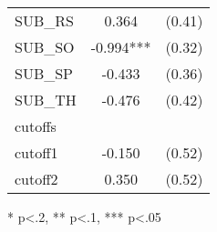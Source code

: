 \begin{table}[htb]
\begin{threeparttable}
\begin{tabular}{l c c}
      SUB\_RS                               & 0.364                  & (0.41)               \\
      SUB\_SO                               & -0.994***              & (0.32)               \\
      SUB\_SP                               & -0.433                 & (0.36)               \\
      SUB\_TH                               & -0.476                 & (0.42)               \\
      \hline
      cutoffs                               &                        &                      \\
      cutoff1                               & -0.150                 & (0.52)               \\
      cutoff2                               & 0.350                  & (0.52)               \\
      \hline
      \hline
    \end{tabular}
    \begin{tablenotes}
    \item{* p<.2, ** p<.1, *** p<.05}
    \end{tablenotes}
  \end{threeparttable}
\end{table}

\clearpage{}

\newpage{}


